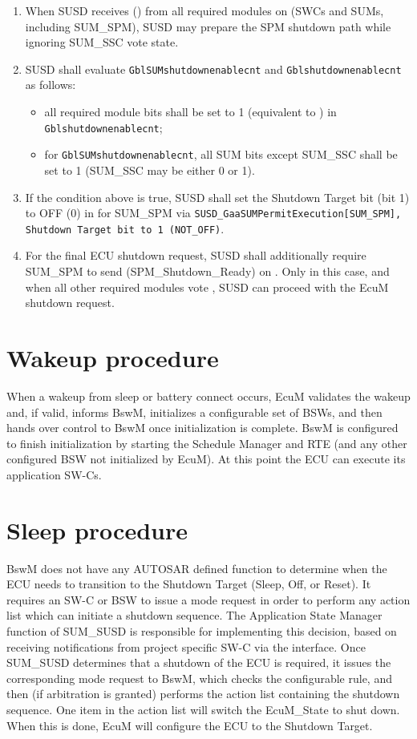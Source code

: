 \begin{enumerate}
\item When SUSD receives  () from all required modules on  (SWCs and SUMs, including SUM\_SPM), SUSD may prepare the SPM shutdown path while ignoring SUM\_SSC vote state.
\item SUSD shall evaluate \texttt{GblSUMshutdownenablecnt} and \texttt{Gblshutdownenablecnt} as follows:
\begin{itemize}
\item all required module bits shall be set to 1 (equivalent to ) in \texttt{Gblshutdownenablecnt};
\item for \texttt{GblSUMshutdownenablecnt}, all SUM bits except SUM\_SSC shall be set to 1 (SUM\_SSC may be either 0 or 1).
\end{itemize}
\item If the condition above is true, SUSD shall set the Shutdown Target bit (bit 1) to OFF (0) in  for SUM\_SPM via \texttt{SUSD\_GaaSUMPermitExecution[SUM\_SPM], Shutdown Target bit to 1 (NOT\_OFF)}.
\item For the final ECU shutdown request, SUSD shall additionally require SUM\_SPM to send  (SPM\_Shutdown\_Ready) on . Only in this case, and when all other required modules vote , SUSD can proceed with the EcuM shutdown request.
\end{enumerate}

\section{Wakeup procedure}
When a wakeup from sleep or battery connect occurs, EcuM validates the wakeup and, if valid, informs BswM, initializes a configurable set of BSWs, and then hands over control to BswM once initialization is complete.
BswM is configured to finish initialization by starting the Schedule Manager and RTE (and any other configured BSW not initialized by EcuM).
At this point the ECU can execute its application SW-Cs.

\section{Sleep procedure}
{BswM does not have any AUTOSAR defined function to determine when the ECU needs to transition to the Shutdown Target (Sleep, Off, or Reset).
It requires an SW-C or BSW to issue a mode request in order to perform any action list which can initiate a shutdown sequence.
The Application State Manager function of SUM_SUSD is responsible for implementing this decision, based on receiving notifications from project specific SW-C via the  interface.
Once SUM_SUSD determines that a shutdown of the ECU is required, it issues the corresponding mode request to BswM, which checks the configurable rule, and then (if arbitration is granted) performs the action list containing the shutdown sequence.
One item in the action list will switch the EcuM_State to shut down. When this is done, EcuM will configure the ECU to the Shutdown Target.}
{}



